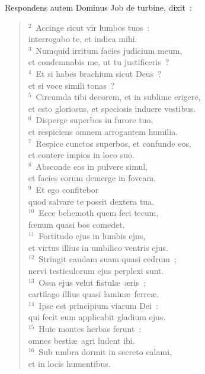 \lettrine[lines=3,image=true,loversize=0.05,lraise=-0.03]{R}{}espondens autem Dominus Job de turbine, dixit~:
\begin{flushleft}\begin{verse}\vspace{6pt}${}^{2}$~Accinge sicut vir lumbos tuos~:\\ interrogabo te, et indica mihi.\\
${}^{3}$~Numquid irritum facies judicium meum,\\ et condemnabis me, ut tu justificeris~?\\
${}^{4}$~Et si habes brachium sicut Deus~?\\ et si voce simili tonas~?\\
${}^{5}$~Circumda tibi decorem, et in sublime erigere,\\ et esto gloriosus, et speciosis induere vestibus.\\
${}^{6}$~Disperge superbos in furore tuo,\\ et respiciens omnem arrogantem humilia.\\
${}^{7}$~Respice cunctos superbos, et confunde eos,\\ et contere impios in loco suo.\\
${}^{8}$~Absconde eos in pulvere simul,\\ et facies eorum demerge in foveam.\\
${}^{9}$~Et ego confitebor\\ quod salvare te possit dextera tua.\\
${}^{10}$~Ecce behemoth quem feci tecum,\\ fœnum quasi bos comedet.\\
${}^{11}$~Fortitudo ejus in lumbis ejus,\\ et virtus illius in umbilico ventris ejus.\\
${}^{12}$~Stringit caudam suam quasi cedrum~;\\ nervi testiculorum ejus perplexi sunt.\\
${}^{13}$~Ossa ejus velut fistul\ae\ \ae ris~;\\ cartilago illius quasi lamin\ae\ ferre\ae .\\
${}^{14}$~Ipse est principium viarum Dei~:\\ qui fecit eum applicabit gladium ejus.\\
${}^{15}$~Huic montes herbas ferunt~:\\ omnes besti\ae\ agri ludent ibi.\\
${}^{16}$~Sub umbra dormit in secreto calami,\\ et in locis humentibus.\\

\end{verse}
\end{flushleft}
